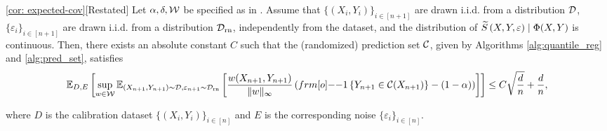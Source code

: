 \begin{customcor}{\ref*{cor: expected-cov}}[Restated]
Let $\alpha, \delta, {\cal W}$ be specified as in . Assume that $\{(X_i,Y_i)\}_{i\in [n+1]}$ are drawn \mbox{i.i.d.} from a distribution ${\cal D}$, $\{\varepsilon_i\}_{i\in [n+1]}$ are drawn \mbox{i.i.d.} from a distribution ${\cal D}_{\text{rn}}$, independently from the dataset, and the distribution of ${\widetilde{S}}\left(X,Y, \varepsilon\right) \mid \Phi(X,Y)$ is continuous. Then, there exists an absolute constant $C$ such that the (randomized) prediction set ${\cal C}$, given by Algorithms \ref{alg:quantile_reg} and \ref{alg:pred_set}, satisfies
\begin{align*}
\EE_{D,E}  \left[ \sup_{w\in\calW} \EE_{(X_{n+1},Y_{n+1}) \sim \calD, \varepsilon_{n+1} \sim \calD_{\text{rn}}}\qth{\frac{w(X_{n+1},Y_{n+1})}{\|w\|_{\infty}}\pth{\11\sth{Y_{n+1} \in \calC(X_{n+1})}- (1-\alpha)}}\right] \leq 
C \sqrt{\frac{d}{n}} + \frac{d}{n},
\end{align*}

where $D$ is the calibration dataset $\{(X_i,Y_i)\}_{i\in [n]}$ and $E$ is the corresponding noise $\{\varepsilon_i\}_{i\in [n]}$.
\begin{comment}
Let $\alpha,\calW, \calC$ be as specified in \Cref{thm:jointcondcov}. Assume $\{(X_i,Y_i, \varepsilon_i)\}_{i\in [n+1]}$ are independent and identically distributed random variables drawn from the distribution $\calD$, and the distribution of $\tS\left(X,Y, \varepsilon\right) \mid \Phi(X,Y)$ is continuous. The calibration dataset $D = \{(X_i,Y_i, \varepsilon_i)\}_{i\in [n]}$ follows the distribution $D\sim\calD^n$. There exists an absolute constant $C$ such that the prediction set $\calC$ satisfies
\begin{align*}
\EE_{D\sim\calD^n}  \left[ \sup_{w\in\calW} \EE_{(X_{n+1},Y_{n+1}, \varepsilon_{n+1})\sim \calD}\qth{\frac{w(X_{n+1},Y_{n+1})}{\|w\|_{\infty}}\pth{\11\sth{Y_{n+1} \in \calC(X_{n+1})}- (1-\alpha)}}\right] \leq 
C \sqrt{\frac{d}{n}} + \frac{d}{n}.
\end{align*}
\end{comment}
\end{customcor}
